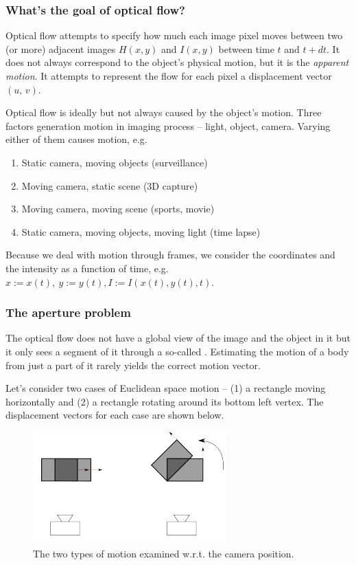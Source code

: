 \documentclass[a4paper]{article}
\begin{document}
\subsubsection{What's the goal of optical flow?}

Optical flow attempts to specify how much each image pixel moves between two (or more) adjacent images $H(x,y)$ and $I(x,y)$ between time $t$ and $t+dt$. It does not always correspond to the object's physical motion, but it is the \textit{apparent motion}. It attempts to represent the flow for each pixel a displacement vector $(u,\, v)$.

Optical flow is ideally but not always caused by the object's motion. Three factors generation motion in imaging process -- light, object, camera. Varying either of them causes motion, e.g.
\begin{enumerate}
    \item Static camera, moving objects (surveillance)
    \item Moving camera, static scene (3D capture)
    \item Moving camera, moving scene (sports, movie)
    \item Static camera, moving objects, moving light (time lapse)
\end{enumerate}
Because we deal with motion through frames, we consider the coordinates and the intensity as a function of time, e.g. $x:=x(t),\ y:=y(t), I := I\left(x(t),y(t),t\right)$.

\subsubsection{The aperture problem}

The optical flow does not have a global view of the image and the object in it but it only sees a segment of it through a so-called . Estimating the motion of a body from just a part of it rarely yields the correct motion vector.

Let's consider two cases of Euclidean space motion -- (1) a rectangle moving horizontally and (2) a rectangle rotating around its bottom left vertex. The displacement vectors for each case are shown below.

\begin{figure}[H]
    \centering
    \includegraphics[scale=0.85]{img/opt_flow/rect_camera.PNG}
    \caption{The two types of motion examined w.r.t. the camera position.}
\end{figure}
\end{document}
